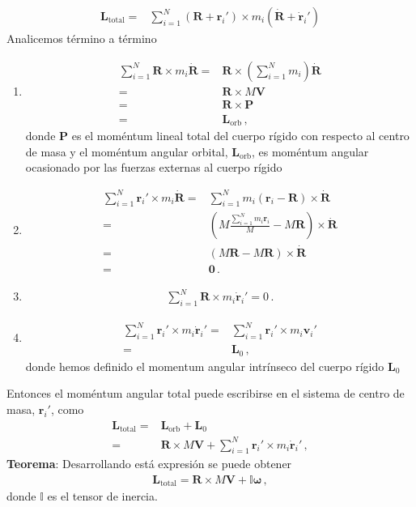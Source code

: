 \begin{align}
   \mathbf{L}_{\text{total}}=&\sum_{i=1}^N
   \left(\mathbf{R}+\mathbf{r}_i'\right)\times m_i
   \left(\dot{\mathbf{R}}+\dot{\mathbf{r}}_i'\right)
\end{align}
Analicemos término a término
\begin{enumerate}
\item 
\begin{align*}
  \sum_{i=1}^N\mathbf{R}\times m_i\dot{\mathbf{R}}=&\mathbf{R}\times
  \left(\sum_{i=1}^N m_i\right)\dot{\mathbf{R}}\nonumber\\
  =&\mathbf{R}\times M\mathbf{V}\nonumber\\
  =&\mathbf{R}\times \mathbf{P}\nonumber\\
  =&\mathbf{L}_{\text{orb}}\,,
\end{align*}
donde $\mathbf{P}$ es el moméntum lineal total del cuerpo rígido con
respecto al centro de masa y el moméntum angular orbital,
$\mathbf{L}_{\text{orb}}$, es moméntum angular ocasionado por las
fuerzas externas al cuerpo rígido
\item
  \begin{align}
    \label{eq:rmr}
    \sum_{i=1}^N\mathbf{r}_i'\times m_i \dot{\mathbf{R}}
    =&\sum_{i=1}^N m_i\left(\mathbf{r}_i-\mathbf{R}\right)\times  \dot{\mathbf{R}}\nonumber\\
    =&\left(M\frac{\sum_{i=1}^N m_i\mathbf{r}_i}{M}- M \mathbf{R}\right)\times  \dot{\mathbf{R}}\nonumber\\
    =&\left(M\mathbf{R}- M \mathbf{R}\right)\times  \dot{\mathbf{R}}\nonumber\\
    =&\mathbf{0}\,.
  \end{align}
\item
  \begin{align*}
    \sum_{i=1}^N \mathbf{R}\times m_i \dot{\mathbf{r}}_i'=0\,.
  \end{align*}
\item
  \begin{align*}
    \sum_{i=1}^N \mathbf{r}_i'\times m_i \dot{\mathbf{r}}_i'=&
    \sum_{i=1}^N \mathbf{r}_i'\times m_i \mathbf{v}_i'\nonumber\\
    =&\mathbf{L}_0\,,
  \end{align*}
donde hemos definido el momentum angular intrínseco del cuerpo rígido $\mathbf{L}_0$


\end{enumerate}

Entonces el moméntum angular total puede  escribirse en el sistema de centro de masa, $\mathbf{r}_i'$, como 
\begin{align}
  \label{eq:lcm}
   \mathbf{L}_{\text{total}}=&\mathbf{L}_{\text{orb}}+\mathbf{L}_0\nonumber\\
   =&\mathbf{R}\times M\mathbf{V}+\sum_{i=1}^N \mathbf{r}_i'\times m_i\dot{\mathbf{r}}_i'\,,
\end{align}
\noindent
\textbf{Teorema}: Desarrollando está expresión se puede obtener
\begin{align}
  \label{eq:tensorI}
  \mathbf{L}_{\text{total}}=\mathbf{R}\times M\mathbf{V}+\mathbb{I}\boldsymbol{\omega}\,,
\end{align}
donde $\mathbb{I}$ es el tensor de inercia. 
\medskip

